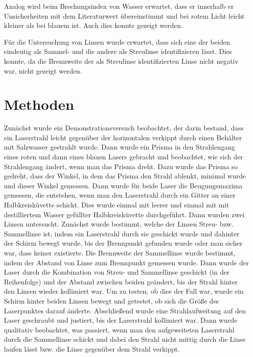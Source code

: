 \documentclass[
	a4paper,
	12pt,
	pagesize,
	ngerman
]{scrartcl}
\begin{document}
	Analog wird beim Brechungsindex von Wasser erwartet, dass er innerhalb er Unsicherheiten mit dem Literaturwert übereinstimmt und bei rotem Licht leicht kleiner als bei blauem ist.
	Auch dies konnte gezeigt werden.
	
	Für die Untersuchung von Linsen wurde erwartet, dass sich eine der beiden eindeutig als Sammel- und die andere als Streulinse identifizieren lässt.
	Dies konnte, da die Brennweite der als Streulinse identifizierten Linse nicht negativ war, nicht gezeigt werden.
	
	\section{Methoden}
	Zunächst wurde ein Demonstrationsversuch beobachtet, der darin bestand, dass ein Laserstrahl leicht gegenüber der horizontalen verkippt durch einen Behälter mit Salzwasser gestrahlt wurde.
	Dann wurde ein Prisma in den Strahlengang eines roten und dann eines blauen Lasers gebracht und beobachtet, wie sich der Strahlengang ändert, wenn man das Prisma dreht.
	Dazu wurde das Prisma so gedreht, dass der Winkel, in dem das Prisma den Strahl ablenkt, minimal wurde und dieser Winkel gemessen.
	Dann wurde für beide Laser die Beugungsmaxima gemessen, die entstehen, wenn man den Laserstrahl durch ein Gitter an einer Halbkreisküvette schickt.
	Dies wurde einmal mit leerer und einmal mit mit destilliertem Wasser gefüllter Halbkreisküvette durchgeführt.
	Dann wurden zwei Linsen untersucht.
	Zunächst wurde bestimmt, welche der Linsen Streu- bzw. Sammellinse ist, indem ein Laserstrahl durch sie geschickt wurde und dahinter der Schirm bewegt wurde, bis der Brennpunkt gefunden wurde oder man sicher war, dass keiner existierte. %
	Die Brennweite der Sammellinse wurde bestimmt, indem der Abstand von Linse zum Brennpunkt gemessen wurde.
	Dann wurde der Laser durch die Kombination von Streu- und Sammellinse geschickt (in der Reihenfolge) und der Abstand zwischen beiden geändert, bis der Strahl hinter den Linsen wieder kollimiert war.
	Um zu testen, ob dies der Fall war, wurde ein Schirm hinter beiden Linsen bewegt und getestet, ob sich die Größe des Laserpunktes darauf änderte.
	Abschließend wurde eine Strahlaufweitung auf den Laser geschraubt und justiert, bis der Laserstrahl kollimiert war.
	Dann wurde qualitativ beobachtet, was passiert, wenn man den aufgeweiteten Laserstrahl durch die Sammellinse schickt und dabei den Strahl nicht mittig durch die Linse laufen lässt bzw. die Linse gegenüber dem Strahl verkippt.
	
\end{document}
